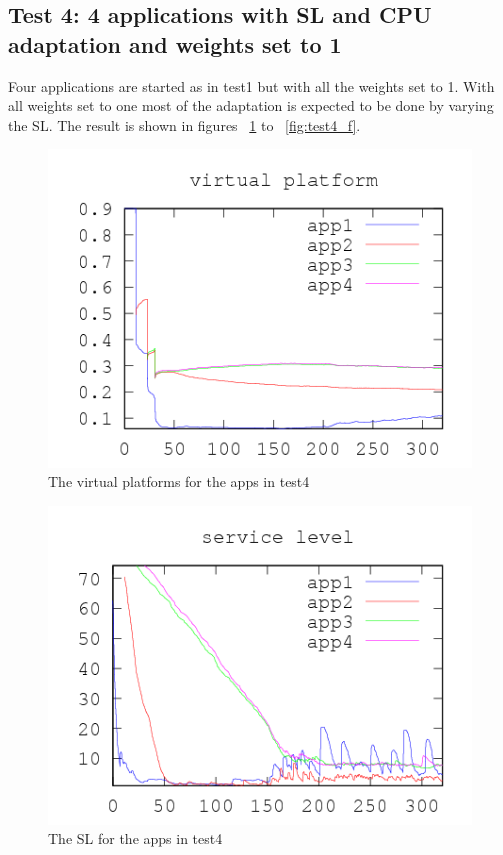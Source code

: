 \documentclass[nobiblatex]{LTHthesis}
\begin{document}
\subsection{Test 4: 4 applications with SL and CPU adaptation and weights set to 1}
Four applications are started as in test1 but with all the weights set to 1.
With all weights set to one most of the adaptation is expected to be done by varying the SL.
The result is shown in figures ~\ref{fig:test4_vp} to ~\ref{fig:test4_f}. 

\begin{figure}[!H]
  \centering
  \includegraphics{"tools/plot/logs/test4/vp"}
  \caption{The virtual platforms for the apps in test4}
  \label{fig:test4_vp}
\end{figure}

\begin{figure}[!H]
  \centering
  \includegraphics{"tools/plot/logs/test4/sl"}
  \caption{The SL for the apps in test4}
  \label{fig:test4_sl}
\end{figure}
\end{document}
